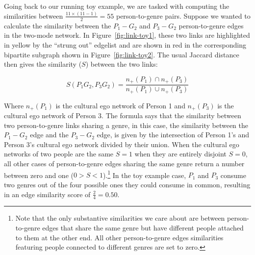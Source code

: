 \documentclass[a4paper,12pt]{extarticle}
\begin{document}
Going back to our running toy example, we are tasked with computing the similarities between $\frac{11 \times (11-1)}{2} = 55$ person-to-genre pairs. Suppose we wanted to calculate the similarity between the $P_1-G_2$ and $P_3-G_2$ person-to-genre edges in the two-mode network. In Figure~\ref{fig:link-toy1}, these two links are highlighted in yellow by the ``strung out'' edgelist and are shown in red in the corresponding bipartite subgraph shown in Figure~\ref{fig:link-toy2}. The usual Jaccard distance then gives the similarity ($S$) between the two links:

\begin{equation}
    S(P_1G_2, P_3G_2) = \frac{n_+(P_1) \cap n_+(P_3)}{n_+(P_1) \cup n_+(P_3)}
\end{equation}

Where $n_+(P_1)$ is the cultural ego network of Person 1 and $n_+(P_3)$ is the cultural ego network of Person 3. The formula says that the similarity between two person-to-genre links sharing a genre, in this case, the similarity between the $P_1-G_2$ edge and the $P_3-G_2$ edge, is given by the intersection of Person 1's and Person 3's cultural ego network divided by their union. When the cultural ego networks of two people are the same $S=1$ when they are entirely disjoint $S = 0$, all other cases of person-to-genre edges sharing the same genre return a number between zero and one ($0 > S < 1$).\footnote{Note that the only substantive similarities we care about are between person-to-genre edges that share the same genre but have different people attached to them at the other end. All other person-to-genre edges similarities featuring people connected to different genres are set to zero.} In the toy example case, $P_1$ and $P_3$ consume two genres out of the four possible ones they could consume in common, resulting in an edge similarity score of $\frac{2}{4} = 0.50$. 
\end{document}
